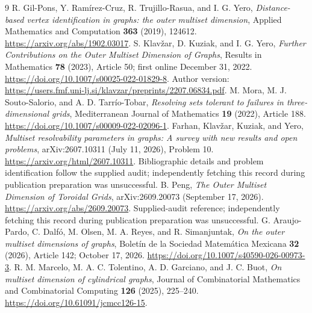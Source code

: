 \documentclass[11pt,a4paper]{article}
\begin{document}
\begin{thebibliography}{9}
 R. Gil-Pons, Y. Ram\'irez-Cruz, R. Trujillo-Rasua, and I. G. Yero, \emph{Distance-based vertex identification in graphs: the outer multiset dimension}, Applied Mathematics and Computation \textbf{363} (2019), 124612. \url{https://arxiv.org/abs/1902.03017}.
 S. Klav\v zar, D. Kuziak, and I. G. Yero, \emph{Further Contributions on the Outer Multiset Dimension of Graphs}, Results in Mathematics \textbf{78} (2023), Article 50; first online December 31, 2022. \url{https://doi.org/10.1007/s00025-022-01829-8}. Author version: \url{https://users.fmf.uni-lj.si/klavzar/preprints/2207.06834.pdf}.
 M. Mora, M. J. Souto-Salorio, and A. D. Tarr\'io-Tobar, \emph{Resolving sets tolerant to failures in three-dimensional grids}, Mediterranean Journal of Mathematics \textbf{19} (2022), Article 188. \url{https://doi.org/10.1007/s00009-022-02096-1}.
 Farhan, Klav\v zar, Kuziak, and Yero, \emph{Multiset resolvability parameters in graphs: A survey with new results and open problems}, arXiv:2607.10311 (July 11, 2026), Problem 10. \url{https://arxiv.org/html/2607.10311}. Bibliographic details and problem identification follow the supplied audit; independently fetching this record during publication preparation was unsuccessful.
 B. Peng, \emph{The Outer Multiset Dimension of Toroidal Grids}, arXiv:2609.20073 (September 17, 2026). \url{https://arxiv.org/abs/2609.20073}. Supplied-audit reference; independently fetching this record during publication preparation was unsuccessful.
 G. Araujo-Pardo, C. Dalf\'o, M. Olsen, M. A. Reyes, and R. Simanjuntak, \emph{On the outer multiset dimensions of graphs}, Bolet\'in de la Sociedad Matem\'atica Mexicana \textbf{32} (2026), Article 142; October 17, 2026. \url{https://doi.org/10.1007/s40590-026-00973-3}.
 R. M. Marcelo, M. A. C. Tolentino, A. D. Garciano, and J. C. Buot, \emph{On multiset dimension of cylindrical graphs}, Journal of Combinatorial Mathematics and Combinatorial Computing \textbf{126} (2025), 225--240. \url{https://doi.org/10.61091/jcmcc126-15}.
\end{thebibliography}
\end{document}
